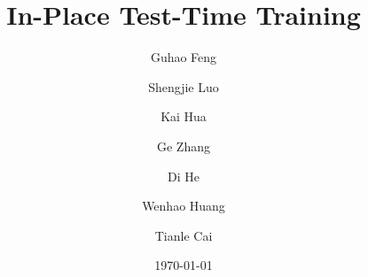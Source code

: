 \documentclass[]{bytedance_seed}
\title{In-Place Test-Time Training}
\author[1,2,*,\star]{Guhao Feng}
\author[1,\star]{Shengjie Luo}
\author[1]{Kai Hua}
\author[1]{Ge Zhang}
\author[2, \dagger]{Di He}
\author[1, \dagger]{Wenhao Huang}
\author[1]{Tianle Cai}
\affiliation[1]{ByteDance Seed}
\affiliation[2]{Peking University}
\date{\today}
\begin{document}
\maketitle








\clearpage




\clearpage

\beginappendix


\end{document}
